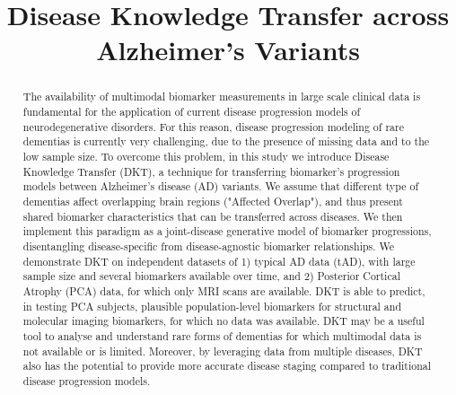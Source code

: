 \documentclass{llncs}
\begin{document}

\title{Disease Knowledge Transfer across Alzheimer's Variants}
%
%

% 
% 


\maketitle              %

\begin{abstract}

The availability of multimodal biomarker measurements in large scale clinical data is fundamental for the application of current disease progression models of neurodegenerative disorders. For this reason, disease progression modeling of rare dementias is currently very challenging, due to the presence of missing data and to the low sample size. To overcome this problem, in this study we introduce Disease Knowledge Transfer (DKT), a technique for transferring biomarker's progression models between Alzheimer's disease (AD) variants. We assume that different type of dementias affect overlapping brain regions ("Affected Overlap"), and thus present shared biomarker characteristics that can be transferred across diseases. We then implement this paradigm as a joint-disease generative model of biomarker progressions, disentangling disease-specific from  disease-agnostic biomarker relationships. We demonstrate DKT on independent datasets of 1) typical AD data (tAD), with large sample size and several biomarkers available over time, and 2) Posterior Cortical Atrophy (PCA) data, for which only MRI scans are available. DKT is able to predict, in testing PCA subjects, plausible population-level biomarkers for structural and molecular imaging biomarkers, for which no data was available. DKT may be a useful tool to analyse and understand rare forms of dementias for which multimodal data is not available or is limited. Moreover, by leveraging data from multiple diseases, DKT also has the potential to provide more accurate disease staging compared to traditional disease progression models.


\end{abstract}
\end{document}
